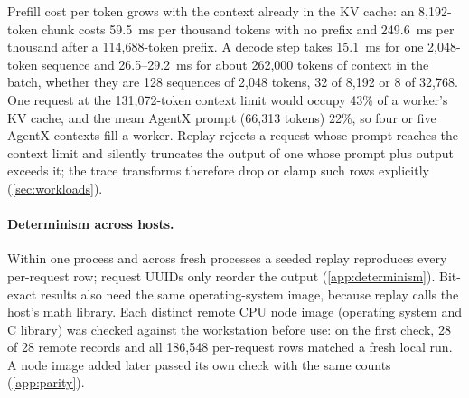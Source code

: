 Prefill cost per token grows with the context already in the KV cache: an 8,192-token chunk costs
\SI{59.5}{ms} per thousand tokens with no prefix and \SI{249.6}{ms} per thousand after a
114,688-token prefix.
A decode step takes \SI{15.1}{ms} for one 2,048-token sequence and 26.5--\SI{29.2}{ms} for about
262,000 tokens of context in the batch, whether they are 128 sequences of 2,048 tokens, 32 of 8,192
or 8 of 32,768.
One request at the 131,072-token context limit would occupy 43\% of a worker's KV cache, and the
mean AgentX prompt (66,313 tokens) 22\%, so four or five AgentX contexts fill a worker.
Replay rejects a request whose prompt reaches the context limit and silently truncates the output
of one whose prompt plus output exceeds it; the trace transforms therefore drop or clamp such
rows explicitly (\cref{sec:workloads}).

\paragraph{Determinism across hosts.}
Within one process and across fresh processes a seeded replay reproduces every per-request row;
request UUIDs only reorder the output (\cref{app:determinism}).
Bit-exact results also need the same operating-system image, because replay calls the host's
math library. Each distinct remote CPU node image (operating system and C library) was checked
against the workstation before use: on the first check, 28 of 28 remote records and all 186,548
per-request rows matched a fresh local run. A node image added later passed its own check with the
same counts (\cref{app:parity}).

